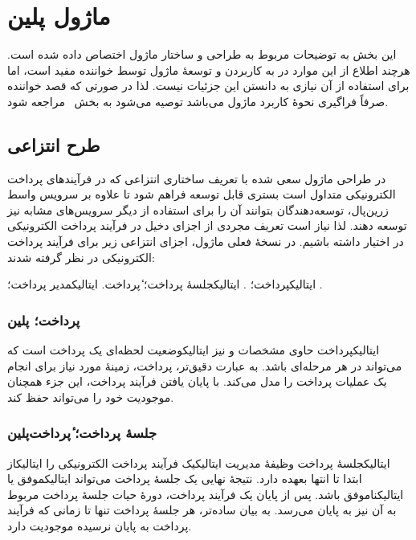 \section{ماژول ‌پلین{}}
\label{بخش:ماژول}

این بخش به توضیحات مربوط به طراحی و ساختار
ماژول  اختصاص داده شده است. هرچند اطلاع
از این موارد در به کاربردن و توسعهٔ ماژول توسط
خواننده مفید است، اما برای استفاده از آن نیازی به
دانستن این جزئیات نیست. لذا در صورتی که قصد
خواننده صرفاً فراگیری نحوهٔ کاربرد ماژول می‌باشد
توصیه می‌شود به بخش~ مراجعه شود.

\subsection{طرح انتزاعی}
در طراحی ماژول سعی شده با تعریف ساختاری
انتزاعی که در
فرآیندهای پرداخت الکترونیکی متداول است
بستری قابل توسعه فراهم شود تا علاوه بر سرویس واسط
زرین‌پال، توسعه‌دهندگان بتوانند آن را برای 
استفاده از دیگر سرویس‌های مشابه نیز توسعه دهند.
لذا نیاز است تعریف مجردی از اجزای دخیل در
فرآیند پرداخت الکترونیکی در اختیار داشته باشیم.
در نسخهٔ فعلی ماژول، اجزای انتزاعی زیر برای فرآیند 
پرداخت الکترونیکی در نظر گرفته شدند:
\begin{itemize}
	 ‌ایتالیک{پرداخت}؛ .
	 ‌ایتالیک{جلسهٔ پرداخت}؛ ٔ‌پرداخت{}.
	 ‌ایتالیک{مدیر پرداخت}؛ .
\end{itemize}


\subsubsection{پرداخت؛ ‌پلین{}}
‌ایتالیک{پرداخت} حاوی مشخصات و نیز
‌ایتالیک{وضعیت لحظه‌ای} یک پرداخت
است که می‌تواند در هر مرحله‌ای باشد.
به عبارت دقیق‌تر، پرداخت، زمینهٔ
مورد نیاز برای انجام یک عملیات پرداخت
را مدل می‌کند. با پایان یافتن فرآیند پرداخت،
این جزء همچنان موجودیت خود را می‌تواند حفظ کند. 

\subsubsection{جلسهٔ پرداخت؛ ٔ‌پرداخت‌پلین{}}
‌ایتالیک{جلسهٔ پرداخت} وظیفهٔ مدیریت
‌ایتالیک{یک} فرآیند پرداخت الکترونیکی را
‌ایتالیک{از ابتدا تا انتها} بعهده دارد.
نتیجهٔ نهایی یک جلسهٔ پرداخت می‌تواند
‌ایتالیک{موفق} یا ‌ایتالیک{ناموفق} باشد. 
پس از پایان یک فرآیند پرداخت، دورهٔ حیات
جلسهٔ پرداخت مربوط به آن نیز به پایان می‌رسد.
به بیان ساده‌تر، هر جلسهٔ پرداخت تنها تا زمانی
که فرآیند پرداخت به پایان نرسیده موجودیت دارد.

